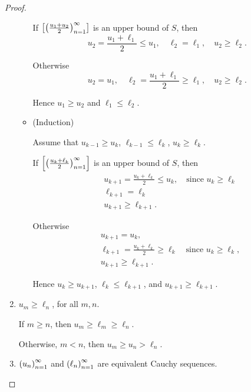 \begin{proof}
\begin{enumerate}[label={\textbf{Step \arabic*.}},itemindent=1cm]
\begin{itemize}
                        If $\left[{{\left({\frac{u_{1} + u_{2}}{2}}\right)}^{\infty}_{n=1}}\right]$ is an upper bound of $S$, then
                        \[
                            u_{2} = \frac{u_{1} + \ell_{1}}{2} \le u_{1},\quad \ell_{2} = \ell_{1},\quad u_{2}\ge\ell_{2}.
                        \]

                        Otherwise
                        \[
                            u_{2} = u_{1},\quad \ell_{2} = \frac{u_{1} + \ell_{1}}{2}\ge\ell_{1},\quad u_{2}\ge\ell_{2}.
                        \]

                        Hence $u_{1}\ge u_{2}$ and $\ell_{1}\le\ell_{2}$.
                  \item (Induction)

                        Assume that $u_{k-1}\ge u_{k}$, $\ell_{k-1}\le\ell_{k}$, $u_{k}\ge\ell_{k}$.

                        If $\left[{{\left({\frac{u_{k} + \ell_{k}}{2}}\right)}^{\infty}_{n=1}}\right]$ is an upper bound of $S$, then
                        \[
                            \begin{split}
                                & u_{k+1} = \frac{u_{k} + \ell_{k}}{2}\le u_{k}, \quad\text{since $u_{k}\ge\ell_{k}$} \\
                                & \ell_{k+1} = \ell_{k} \\
                                & u_{k+1}\ge\ell_{k+1}.
                            \end{split}
                        \]

                        Otherwise
                        \[
                            \begin{split}
                                & u_{k+1} = u_{k}, \\
                                & \ell_{k+1} = \frac{u_{k} + \ell_{k}}{2}\ge \ell_{k}\quad\text{since $u_{k}\ge\ell_{k}$}, \\
                                & u_{k+1}\ge\ell_{k+1}.
                            \end{split}
                        \]

                        Hence $u_{k}\ge u_{k+1}$, $\ell_{k}\le\ell_{k+1}$, and $u_{k+1}\ge\ell_{k+1}$.
              \end{itemize}
        \item $u_{m}\ge\ell_{n}$, for all $m, n$.

              If $m\ge n$, then $u_{m}\ge \ell_{m}\ge\ell_{n}$.

              Otherwise, $m < n$, then $u_{m}\ge u_{n} > \ell_{n}$.
        \item ${\left({u_{n}}\right)}^{\infty}_{n=1}$ and ${\left({\ell_{n}}\right)}^{\infty}_{n=1}$ are equivalent Cauchy sequences.


\end{enumerate}
\end{proof}

